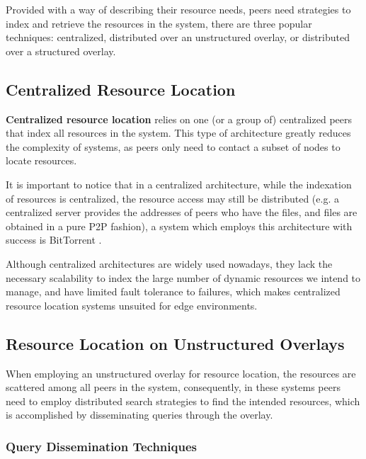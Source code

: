 Provided with a way of describing their resource needs, peers need strategies to index and retrieve the resources in the system, there are three popular techniques: centralized, distributed over an unstructured overlay, or distributed over a structured overlay.

\subsection{Centralized Resource Location}

\textbf{Centralized resource location} relies on one (or a group of) centralized peers that index all resources in the system. This type of architecture greatly reduces the complexity of systems, as peers only need to contact a subset of nodes to locate resources. 

It is important to notice that in a centralized architecture, while the indexation of resources is centralized, the resource access may still be distributed (e.g. a centralized server provides the addresses of peers who have the files, and files are obtained in a pure P2P fashion), a system which employs this architecture with success is BitTorrent \cite{cohen2003incentives}.

Although centralized architectures are widely used nowadays, they lack the necessary scalability to index the large number of dynamic resources we intend to manage, and have limited fault tolerance to failures, which makes centralized resource location systems unsuited for edge environments. 


\subsection{Resource Location on Unstructured Overlays}

When employing an unstructured overlay for resource location, the resources are scattered among all peers in the system, consequently, in these systems peers need to employ distributed search strategies to find the intended resources, which is accomplished by disseminating queries through the overlay.

\subsubsection{Query Dissemination Techniques}

